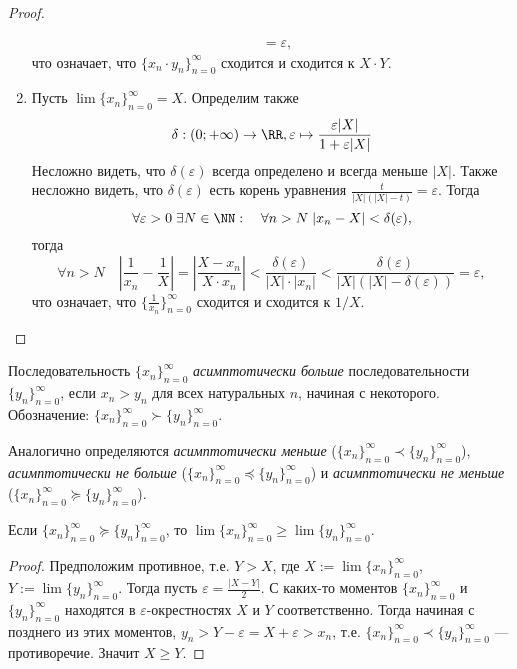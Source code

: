 \documentclass[12pt,a4paper]{article}
\begin{document}
\begin{proof}
\begin{enumerate}
\begin{align*}
                    &= \varepsilon,
                \end{align*}
                что означает, что $\{x_n \cdot y_n\}_{n=0}^\infty$ сходится и сходится к $X \cdot Y$.
            \item Пусть $\lim \{x_n\}_{n=0}^\infty = X$. Определим также
                \[\delta: (0; +\infty) \to \RR, \varepsilon \mapsto \frac{\varepsilon |X|}{1 + \varepsilon |X|}\]
                Несложно видеть, что $\delta(\varepsilon)$ всегда определено и всегда меньше $|X|$. Также несложно видеть, что $\delta(\varepsilon)$ есть корень уравнения $\frac{t}{|X|(|X| - t)} = \varepsilon$. Тогда
                \[\forall \varepsilon > 0\; \exists N \in \NN:\quad \forall n > N\; |x_n - X| < \delta(\varepsilon),\]
                тогда
                \[\forall n > N\quad \left|\frac{1}{x_n} - \frac{1}{X}\right| = \left|\frac{X-x_n}{X\cdot x_n}\right| < \frac{\delta(\varepsilon)}{|X| \cdot |x_n|} < \frac{\delta(\varepsilon)}{|X|(|X|-\delta(\varepsilon))} = \varepsilon,\]
                что означает, что $\{\frac{1}{x_n}\}_{n=0}^\infty$ сходится и сходится к $1/X$.
        \end{enumerate}
    \end{proof}

    \begin{definition}
        Последовательность $\{x_n\}_{n=0}^\infty$ \emph{асимптотически больше} последовательности $\{y_n\}_{n=0}^\infty$, если $x_n > y_n$ для всех натуральных $n$, начиная с некоторого. Обозначение: $\{x_n\}_{n=0}^\infty \succ \{y_n\}_{n=0}^\infty$.

        Аналогично определяются \emph{асимптотически меньше} ($\{x_n\}_{n=0}^\infty \prec \{y_n\}_{n=0}^\infty$), \emph{асимптотически не больше} ($\{x_n\}_{n=0}^\infty \preccurlyeq \{y_n\}_{n=0}^\infty$) и \emph{асимптотически не меньше} ($\{x_n\}_{n=0}^\infty \succcurlyeq \{y_n\}_{n=0}^\infty$).
    \end{definition}

    \begin{statement}\label{stupid_seq_statement_1}
        Если $\{x_n\}_{n=0}^\infty \succcurlyeq \{y_n\}_{n=0}^\infty$, то $\lim \{x_n\}_{n=0}^\infty \geqslant \lim \{y_n\}_{n=0}^\infty$.
    \end{statement}

    \begin{proof}
        Предположим противное, т.е. $Y > X$, где $X := \lim \{x_n\}_{n=0}^\infty$, $Y := \lim \{y_n\}_{n=0}^\infty$. Тогда пусть $\varepsilon = \frac{|X - Y|}{2}$. С каких-то моментов $\{x_n\}_{n=0}^\infty$ и $\{y_n\}_{n=0}^\infty$ находятся в $\varepsilon$-окрестностях $X$ и $Y$ соответственно. Тогда начиная с позднего из этих моментов, $y_n > Y - \varepsilon = X + \varepsilon > x_n$, т.е. $\{x_n\}_{n=0}^\infty \prec \{y_n\}_{n=0}^\infty$ --- противоречие. Значит $X \geqslant Y$.
    \end{proof}
\end{document}
